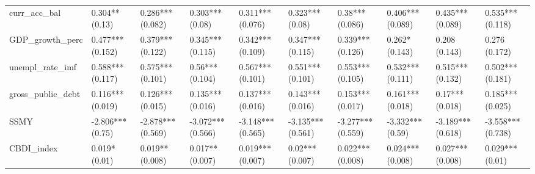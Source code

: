 \begin{table}[ht]
\begin{tabular}{llllllllll}
  curr\_acc\_bal & 0.304** (0.13) & 0.286*** (0.082) & 0.303*** (0.08) & 0.311*** (0.076) & 0.323*** (0.08) & 0.38*** (0.086) & 0.406*** (0.089) & 0.435*** (0.089) & 0.535*** (0.118) \\ 
  GDP\_growth\_perc & 0.477*** (0.152) & 0.379*** (0.122) & 0.345*** (0.115) & 0.342*** (0.109) & 0.347*** (0.115) & 0.339*** (0.126) & 0.262* (0.143) & 0.208 (0.143) & 0.276 (0.172) \\ 
  unempl\_rate\_imf & 0.588*** (0.117) & 0.575*** (0.101) & 0.56*** (0.104) & 0.567*** (0.101) & 0.551*** (0.101) & 0.553*** (0.105) & 0.532*** (0.111) & 0.515*** (0.132) & 0.502*** (0.181) \\ 
  gross\_public\_debt & 0.116*** (0.019) & 0.126*** (0.015) & 0.135*** (0.016) & 0.137*** (0.016) & 0.143*** (0.016) & 0.153*** (0.017) & 0.161*** (0.018) & 0.17*** (0.018) & 0.185*** (0.025) \\ 
  SSMY & -2.806*** (0.75) & -2.878*** (0.569) & -3.072*** (0.566) & -3.148*** (0.565) & -3.135*** (0.561) & -3.277*** (0.559) & -3.332*** (0.59) & -3.189*** (0.618) & -3.558*** (0.738) \\ 
  CBDI\_index & 0.019* (0.01) & 0.019** (0.008) & 0.017** (0.007) & 0.019*** (0.007) & 0.02*** (0.007) & 0.022*** (0.008) & 0.024*** (0.008) & 0.027*** (0.008) & 0.029*** (0.01) \\ 
   \bottomrule
\end{tabular}
\endgroup
\end{table}
